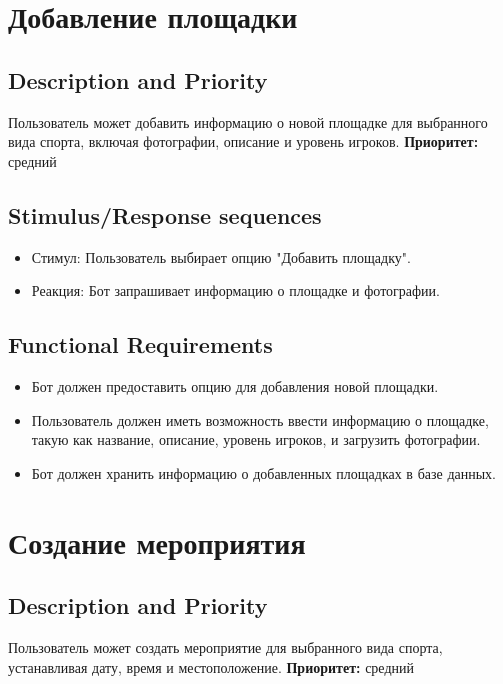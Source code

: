 \documentclass{scrreprt}
\begin{document}
\section{Добавление площадки}

\subsection{Description and Priority}
Пользователь может добавить информацию о новой площадке для выбранного вида спорта, включая фотографии, описание и уровень игроков.
\newline
\textbf{Приоритет:} средний

\subsection{Stimulus/Response sequences}
\begin{itemize}
    \item Стимул: Пользователь выбирает опцию "Добавить площадку".
    \item Реакция: Бот запрашивает информацию о площадке и фотографии.
\end{itemize}

\subsection{Functional Requirements}
\begin{itemize}
    \item Бот должен предоставить опцию для добавления новой площадки.
    \item Пользователь должен иметь возможность ввести информацию о площадке, такую как название, описание, уровень игроков, и загрузить фотографии.
    \item Бот должен хранить информацию о добавленных площадках в базе данных.
\end{itemize}

\section{Создание мероприятия}

\subsection{Description and Priority}
Пользователь может создать мероприятие для выбранного вида спорта, устанавливая дату, время и местоположение.
\newline
\textbf{Приоритет:} средний
\end{document}
